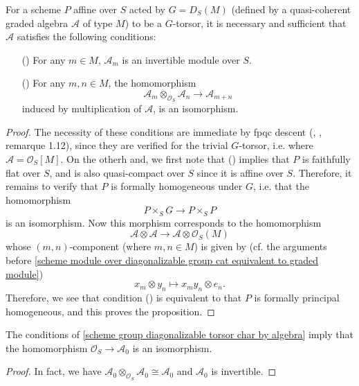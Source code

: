 \begin{proposition}\label{scheme group diagonalizable torsor char by algebra}
For a scheme $P$ affine over $S$ acted by $G=D_S(M)$ (defined by a quasi-coherent graded algebra $\mathscr{A}$ of type $M$) to be a $G$-torsor, it is necessary and sufficient that $\mathscr{A}$ satisfies the following conditions:
\begin{enumerate}
    \item[(\rmnum{1})] For any $m\in M$, $\mathscr{A}_m$ is an invertible module over $S$.
    \item[(\rmnum{2})] For any $m,n\in M$, the homomorphism
    \[\mathscr{A}_m\otimes_{\mathscr{O}_S}\mathscr{A}_n\to\mathscr{A}_{m+n}\] 
    induced by multiplication of $\mathscr{A}$, is an isomorphism.
\end{enumerate}
\end{proposition}
\begin{proof}
The necessity of these conditions are immediate by fpqc descent (\cite{SGA1}, , remarque 1.12), since they are verified for the trivial $G$-torsor, i.e. where $\mathscr{A}=\mathscr{O}_S[M]$. On the otherh and, we first note that () implies that $P$ is faithfully flat over $S$, and is also quasi-compact over $S$ since it is affine over $S$. Therefore, it remains to verify that $P$ is formally homogeneous under $G$, i.e. that the homomorphism
\[P\times_SG\to P\times_SP\]
is an isomorphism. Now this morphism corresponds to the homomorphism
\[\mathscr{A}\otimes\mathscr{A}\to\mathscr{A}\otimes\mathscr{O}_S(M)\]
whose $(m,n)$-component (where $m,n\in M$) is given by (cf. the arguments before \cref{scheme module over diagonalizable group cat equivalent to graded module})
\[x_m\otimes y_n\mapsto x_my_n\otimes e_n.\]
Therefore, we see that condition () is equivalent to that $P$ is formally principal homogeneous, and this proves the proposition.
\end{proof}

\begin{corollary}\label{scheme group diagonalizable torsor O_S to A_0 isomorphism}
The conditions of \cref{scheme group diagonalizable torsor char by algebra} imply that the homomorphism $\mathscr{O}_S\to\mathscr{A}_0$ is an isomorphism.
\end{corollary}
\begin{proof}
In fact, we have $\mathscr{A}_0\otimes_{\mathscr{O}_S}\mathscr{A}_0\cong\mathscr{A}_0$ and $\mathscr{A}_0$ is invertible.
\end{proof}

